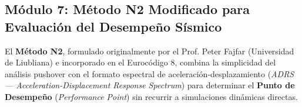 \documentclass[11pt,letterpaper]{article}
\begin{document}
\subsection{Módulo 7: Método N2 Modificado para Evaluación del Desempeño Sísmico}

\begin{modulebox}
El \textbf{Método N2}, formulado originalmente por el Prof. Peter Fajfar (Universidad de Liubliana) e incorporado en el Eurocódigo 8, combina la simplicidad del análisis pushover con el formato espectral de aceleración-desplazamiento (\textit{ADRS --- Acceleration-Displacement Response Spectrum}) para determinar el \textbf{Punto de Desempeño} (\textit{Performance Point}) sin recurrir a simulaciones dinámicas directas.


\end{modulebox}
\end{document}
